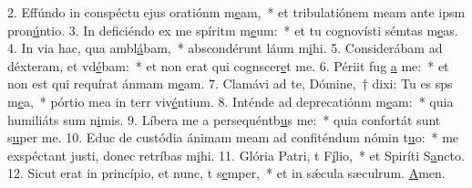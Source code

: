 2. Effúndo in conspéctu ejus oratiónm m\uline{e}am,~* et tribulatiónem meam ante ipsm pron\uline{ú}ntio.
3. In deficiéndo ex me spíritm m\uline{e}um:~* et tu cognovísti sémtas m\uline{e}as.
4. In via hac, qua ambl\uline{á}bam,~* abscondérunt láum m\uline{i}hi.
5. Considerábam ad déxteram, et vd\uline{é}bam:~* et non erat qui cognscer\uline{e}t me.
6. Périit fug \uline{a} me:~* et non est qui requírat ánmam m\uline{e}am.
7. Clamávi ad te, Dómine,~† dixi: Tu es sps m\uline{e}a,~* pórtio mea in terr viv\uline{é}ntium.
8. Inténde ad deprecatiónm m\uline{e}am:~* quia humiliáts sum n\uline{i}mis.
9. Líbera me a persequéntb\uline{u}s me:~* quia confortát sunt s\uline{u}per me.
10. Educ de custódia ánimam meam ad confiténdum nómin t\uline{u}o:~* me exspéctant justi, donec retríbas m\uline{i}hi.
11. Glória Patri, t F\uline{í}lio,~* et Spiríti S\uline{a}ncto.
12. Sicut erat in princípio, et nunc, t s\uline{e}mper,~* et in sǽcula sæculrum. \uline{A}men.
